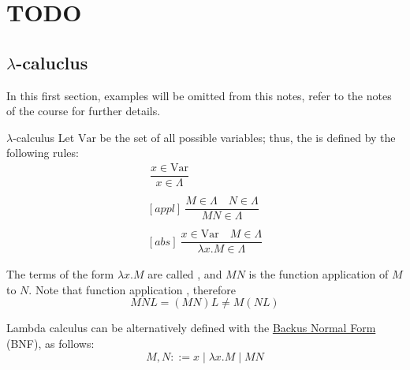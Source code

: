 \documentclass[a4paper, 12pt]{report}
\institute{\curlyquotes{\hspace{0.25mm}Sapienza} Università di Roma}
\subtitle{Appunti integrati con il libro \book}
\author{\textit{Autore}\\\authorName}
\institute{\curlyquotes{\hspace{0.25mm}Sapienza} University of Rome}
\subtitle{Lecture notes integrated with the book \book}
\author{\textit{Author}\\\authorName}
\title{\courseName}
\date{\today}
\begin{document}
    \maketitle

    {
        \hypersetup{allcolors=black}

        \romantableofcontents
    }

    \introduction


    \chapter{TODO}

    \section{$\lambda$-caluclus}

    In this first section, examples will be omitted from this notes, refer to the notes of the  course for further details.

    \begin{frameddefn}[breakable]{$\lambda$-calculus}
        Let $\mathrm{Var}$ be the set of all possible variables; thus, the  is defined by the following rules:
        \begin{gather*}
            [var] \ \dfrac{x \in \mathrm{Var}}{x \in \Lambda} \\ \\
            [appl] \ \dfrac{M \in \Lambda \quad N \in \Lambda}{M N \in \Lambda} \\ \\
            [abs] \ \dfrac{x \in \mathrm{Var} \quad M \in \Lambda}{\lambda x.M \in \Lambda}
        \end{gather*}

        The terms of the form $\lambda x.M$ are called , and $MN$ is the function application of $M$ to $N$. Note that function application , therefore $$MNL = (MN)L \neq M(NL)$$

        Lambda calculus can be alternatively defined with the \href{https://en.wikipedia.org/wiki/Backus%E2%80%93Naur_form}{Backus Normal Form} (BNF), as follows: $$M, N ::= x \mid \lambda x.M \mid M N$$
    \end{frameddefn}
\end{document}

